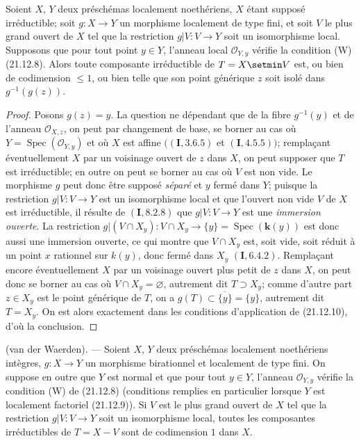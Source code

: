\begin{corollary}[21.12.11]
\label{IV.21.12.11}
Soient $X$, $Y$ deux préschémas localement noethériens, $X$ étant supposé
irréductible; soit $g:X\to Y$ un morphisme localement de type fini, et soit $V$ le plus
grand ouvert de $X$ tel que la restriction $g|V:V\to Y$ soit un isomorphisme local.
Supposons que pour tout point $y\in Y$, l'anneau local $\mathcal O_{Y,y}$ vérifie la
condition \textup{(W) (21.12.8)}. Alors toute composante irréductible de $T=X\setmin V$ est, \textup{ou bien}
de codimension $\leq1$, \textup{ou bien} telle que son point générique $z$ soit isolé dans
$g^{-1}(g(z))$.
\end{corollary}

\begin{proof}
Posons $g(z)=y$. La question ne dépendant que de la fibre $g^{-1}(y)$ et de l'anneau
$\mathcal O_{X,z}$, on peut par changement de base, se borner au cas où
$Y=\operatorname{Spec}(\mathcal O_{Y,y})$ et où $X$ est affine
$((\mathbf I, 3.6.5)$ et $(\mathbf I, 4.5.5))$; remplaçant éventuellement $X$ par un
voisinage ouvert de $z$ dans $X$, on peut supposer que $T$ est irréductible; en outre on
peut se borner au cas où $V$ est non vide. Le morphisme $g$ peut donc être supposé
\emph{séparé} et $y$ fermé dans $Y$; puisque la restriction $g|V:V\to Y$ est un isomorphisme
local et que l'ouvert non vide $V$ de $X$ est irréductible, il résulte de
$(\mathbf I, 8.2.8)$ que $g|V:V\to Y$ est une \emph{immersion ouverte}. La restriction
$g|(V\cap X_y):V\cap X_y\to\{y\}=\operatorname{Spec}(\boldsymbol{k}(y))$ est donc aussi une
immersion ouverte, ce qui montre que $V\cap X_y$ est, soit vide, soit réduit à un point
$x$ rationnel
sur $k(y)$, donc fermé dans $X_y$ $(\mathbf I, 6.4.2)$. Remplaçant encore
éventuellement $X$ par un voisinage ouvert plus petit de $z$ dans $X$, on peut donc se
borner au cas où $V\cap X_y=\varnothing$, autrement dit $T\supset X_y$; comme d'autre
part $z\in X_y$ est le point générique de $T$, on a
$g(T)\subset\overline{\{y\}}=\{y\}$, autrement dit $T=X_y$. On est alors exactement
dans les conditions d'application de (21.12.10), d'où la conclusion.
\end{proof}

\begin{theorem}[21.12.12]
\label{IV.21.12.12}
\textup{(van der Waerden)}. ---
Soient $X$, $Y$ deux préschémas localement noethériens intègres, $g:X\to Y$ un
morphisme birationnel et localement de type fini. On suppose en outre que $Y$ est
normal et que pour tout $y\in Y$, l'anneau $\mathcal O_{Y,y}$ vérifie la condition (W)
de (21.12.8) (conditions remplies en particulier lorsque $Y$ est localement factoriel
(21.12.9)). Si $V$ est le plus grand ouvert de $X$ tel que la restriction
$g|V:V\to Y$ soit un isomorphisme local, toutes les composantes irréductibles de
$T=X-V$ sont de codimension $1$ dans $X$.
\end{theorem}

